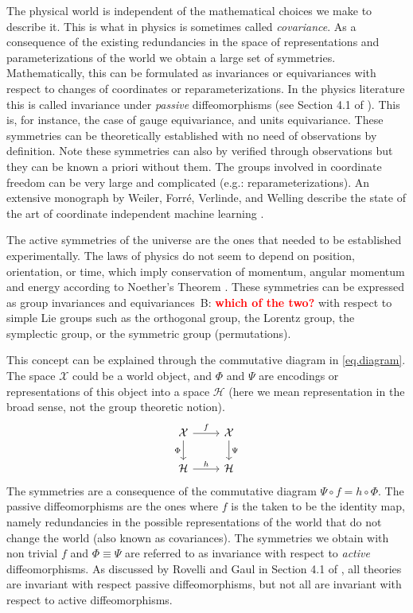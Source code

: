 \documentclass{article}
\newcommand{\bernhard}[1]{~B: \textcolor{red}{\textbf{#1}}}
\begin{document}
The physical world is independent of the mathematical choices we make to describe it. This is what in physics is sometimes called  \emph{covariance}. As a consequence of the existing redundancies in the space of representations and parameterizations of the world we obtain a large set of symmetries. Mathematically, this can be formulated as invariances or equivariances with respect to changes of coordinates or reparameterizations. In the physics literature this is called invariance under \emph{passive} diffeomorphisms (see Section 4.1 of \cite{rovelli2000loop}). This is, for instance, the case of gauge equivariance, and units equivariance. These symmetries can be theoretically established with no need of observations by definition. Note these symmetries can also by verified through observations but they can be known a priori without them. The groups involved in coordinate freedom can be very large and complicated (e.g.: reparameterizations). An extensive monograph by Weiler, Forré, Verlinde, and Welling describe the state of the art of coordinate independent machine learning \cite{weiler}.

The active symmetries of the universe are the ones that needed to be established experimentally. The laws of physics do not seem to depend on position, orientation, or time, which imply conservation of momentum, angular momentum and energy according to Noether's Theorem \cite{noether}. These symmetries can be expressed as group invariances and equivariances\bernhard{which of the two?} with respect to simple Lie groups such as the orthogonal group, the Lorentz group, the symplectic group, or the symmetric group (permutations). 

This concept can be explained through the commutative diagram in \eqref{eq.diagram}. The space $\mathcal X$ could be a world object, and $\Phi$ and $\Psi$ are encodings or representations of this object into a space $\mathcal H$ (here we mean representation in the broad sense, not the group theoretic notion).
\begin{equation}\label{eq.diagram}
\begin{tikzcd}[]%
  {\cal X}\arrow[r,"f"] \arrow[d,"\Phi",swap] & {\cal X}  \arrow[d,"\Psi"]\\
{\cal H} \arrow[r,"h"]  & {\cal H} 
\end{tikzcd}
\end{equation}
The symmetries are a consequence of the commutative diagram $\Psi\circ f = h \circ \Phi$. The passive diffeomorphisms are the ones where $f$ is the taken to be the identity map, namely redundancies in the possible representations of the world that do not change the world (also known as covariances). The symmetries we obtain with non trivial $f$ and $\Phi\equiv \Psi$ are referred to as invariance with respect to \emph{active} diffeomorphisms. As discussed by Rovelli and Gaul in Section 4.1 of \cite{rovelli2000loop}, all theories are invariant with respect passive diffeomorphisms, but not all are invariant with respect to active diffeomorphisms. 
\end{document}
